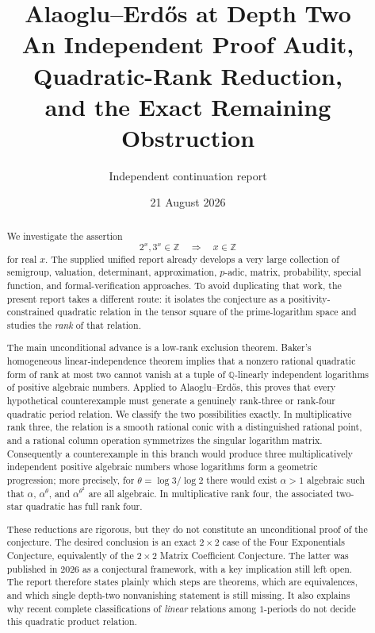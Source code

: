 \documentclass[11pt]{article}
\title{\bfseries Alaoglu--Erd\H{o}s at Depth Two\\[3pt]
\Large An Independent Proof Audit, Quadratic-Rank Reduction,\\
and the Exact Remaining Obstruction}
\author{Independent continuation report}
\date{21 August 2026}
\theoremstyle{definition}
\theoremstyle{remark}
\newcommand{\Q}{\mathbb{Q}}
\newcommand{\Z}{\mathbb{Z}}
\begin{document}
\maketitle

\begin{abstract}
We investigate the assertion
\[
   2^x,3^x\in\Z \quad\Longrightarrow\quad x\in\Z
\]
for real $x$.  The supplied unified report already develops a very large collection of
semigroup, valuation, determinant, approximation, $p$-adic, matrix, probability, special
function, and formal-verification approaches.  To avoid duplicating that work, the present
report takes a different route: it isolates the conjecture as a positivity-constrained
quadratic relation in the tensor square of the prime-logarithm space and studies the
\emph{rank} of that relation.

The main unconditional advance is a low-rank exclusion theorem.  Baker's homogeneous
linear-independence theorem implies that a nonzero rational quadratic form of rank at most
two cannot vanish at a tuple of $\Q$-linearly independent logarithms of positive algebraic
numbers.  Applied to Alaoglu--Erd\H{o}s, this proves that every hypothetical counterexample
must generate a genuinely rank-three or rank-four quadratic period relation.  We classify
the two possibilities exactly.  In multiplicative rank three, the relation is a smooth
rational conic with a distinguished rational point, and a rational column operation
symmetrizes the singular logarithm matrix.  Consequently a counterexample in this branch
would produce three multiplicatively independent positive algebraic numbers whose
logarithms form a geometric progression; more precisely, for
$\theta=\log 3/\log 2$ there would exist $\alpha>1$ algebraic such that
$\alpha$, $\alpha^\theta$, and $\alpha^{\theta^2}$ are all algebraic.  In multiplicative
rank four, the associated two-star quadratic has full rank four.

These reductions are rigorous, but they do not constitute an unconditional proof of the
conjecture.  The desired conclusion is an exact $2\times2$ case of the Four Exponentials
Conjecture, equivalently of the $2\times2$ Matrix Coefficient Conjecture.  The latter was
published in 2026 as a conjectural framework, with a key implication still left open.  The
report therefore states plainly which steps are theorems, which are equivalences, and which
single depth-two nonvanishing statement is still missing.  It also explains why recent
complete classifications of \emph{linear} relations among $1$-periods do not decide this
quadratic product relation.
\end{abstract}
\end{document}
